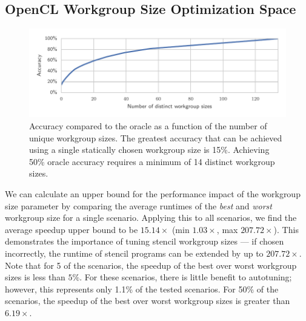 \documentclass[nonatbib,preprint,nocopyrightspace,9pt]{sigplanconf}
\begin{document}
\subsection{OpenCL Workgroup Size Optimization Space}

\begin{figure}
\centering
\includegraphics[width=\columnwidth]{img/num_params_oracle.pdf}
\caption{%
  Accuracy compared to the oracle as a function of the number of unique
  workgroup sizes. The greatest accuracy that can be achieved using a single
  statically chosen workgroup size is 15\%. Achieving 50\% oracle accuracy
  requires a minimum of 14 distinct workgroup sizes.%
}
\label{fig:oracle-accuracy}
\end{figure}

We can calculate an upper bound for the performance impact of the workgroup size
parameter by comparing the average runtimes of the \emph{best} and \emph{worst}
workgroup size for a single scenario. Applying this to all scenarios, we find
the average speedup upper bound to be $15.14\times$ (min $1.03\times$, max
$207.72\times$). This demonstrates the importance of tuning stencil workgroup
sizes --- if chosen incorrectly, the runtime of stencil programs can be extended
by up to $207.72\times$. Note that for 5 of the scenarios, the speedup of the
best over worst workgroup sizes is less than $5\%$. For these scenarios, there
is little benefit to autotuning; however, this represents only 1.1\% of the
tested scenarios. For 50\% of the scenarios, the speedup of the best over worst
workgroup sizes is greater than $6.19\times$.
\end{document}
